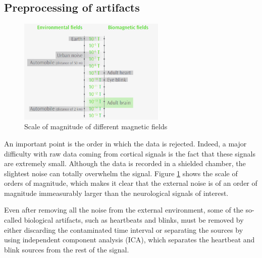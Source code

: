 

\subsection{Preprocessing of artifacts}
\label{preprocessing_of_artifacts}


\begin{figure}[ht]
    \centering
    \includegraphics[width=7cm]{images_report/sensor/noise_order_of_magnitude.png}
    \caption[Scale of magnitude of different magnetic fields]%
    {Scale of magnitude of different magnetic fields}
    \label{noise_order_of_magnitude}
\end{figure}


An important point is the order in which the data is rejected. Indeed, a major difficulty with raw data coming from cortical signals is the fact that these signals are extremely small. Although the data is recorded in a shielded chamber, the slightest noise can totally overwhelm the signal. Figure \ref{noise_order_of_magnitude} shows the scale of orders of magnitude, which makes it clear that the external noise is of an order of magnitude immeasurably larger than the neurological signals of interest.

Even after removing all the noise from the external environment, some of the so-called biological artifacts, such as heartbeats and blinks, must be removed by either discarding the contaminated time interval or separating the sources by using independent component analysis (ICA), which separates the heartbeat and blink sources from the rest of the signal.

